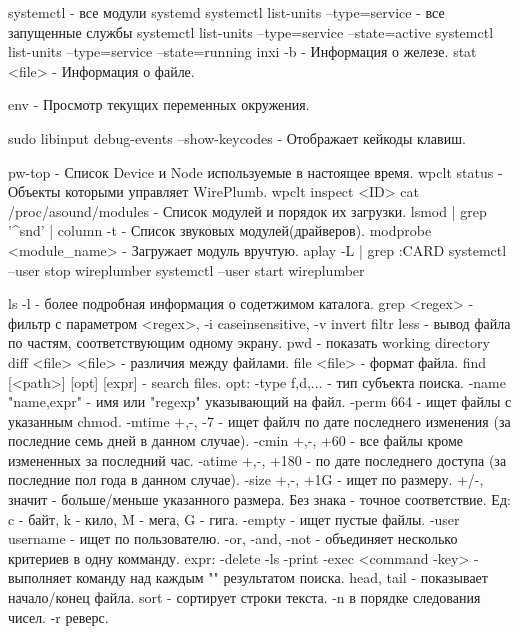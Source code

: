 systemctl - все модули systemd 
systemctl list-units --type=service - все запущенные службы
systemctl list-units --type=service --state=active
systemctl list-units --type=service --state=running
inxi -b - Информация о железе.
stat <file> - Информация о файле.

env - Просмотр текущих переменных окружения.

sudo libinput debug-events --show-keycodes - Отображает кейкоды клавиш.


pw-top - Список Device и Node используемые в настоящее время.
wpclt status - Объекты которыми управляет WirePlumb.
wpclt inspect <ID>
cat /proc/asound/modules - Список модулей и порядок их загрузки.
lsmod | grep '^snd' | column -t - Список звуковых модулей(драйверов).
modprobe <module_name> - Загружает модуль вручтую.
aplay -L | grep :CARD
systemctl --user stop wireplumber
systemctl --user start wireplumber

ls -l              - более подробная информация о содетжимом каталога.
grep <regex>       - фильтр с параметром <regex>, -i caseinsensitive, -v invert filtr
less               - вывод файла по частям, соответствующим одному экрану.
pwd                - показать working directory
diff <file> <file> - различия между файлами.
file <file>        - формат файла. 
find [<path>] [opt] [expr] - search files.
    opt:
        -type {f,d,...} - тип субъекта поиска.
        -name "name,expr" - имя или "regexp" указывающий на файл.
        -perm 664 - ищет файлы с указанным chmod.
        -mtime {+,-, } -7 - ищет файлч по дате последнего изменения (за 
            последние семь дней в данном случае).
        -cmin  {+,-, } +60 - все файлы кроме измененных за последний час.
        -atime {+,-, } +180 - по дате последнего доступа (за последние пол года
            в данном случае).
        -size  {+,-, } +1G - ищет по размеру. +/-, значит - больше/меньше 
            указанного размера. Без знака - точное соответствие. 
            Ед: c - байт, k - кило, M - мега, G - гига.
        -empty - ищет пустые файлы.
        -user username - ищет по пользователю.
        -or, -and, -not - объединяет несколько критериев в одну комманду.
    expr:
        -delete
        -ls
        -print
        -exec <command -key> {} \; - выполняет команду над каждым "{}" 
            результатом поиска.
head, tail         - показывает начало/конец файла.
sort               - сортирует строки текста. -n в порядке следования чисел. -r реверс.

